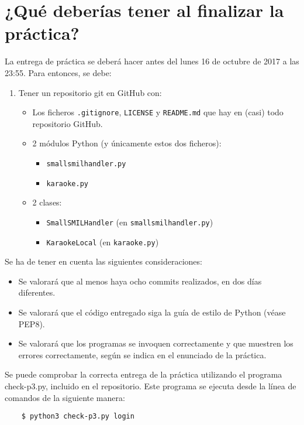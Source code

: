 \documentclass[11pt,a4paper]{article}
\begin{document}
\section{¿Qué deberías tener al finalizar la práctica?}

La entrega de práctica se deberá hacer antes del lunes 16 de octubre de 2017 a las 23:55. Para entonces, se debe: 

\begin{enumerate}
  \item Tener un repositorio git en GitHub con:
  \begin{itemize}
    \item Los ficheros \texttt{.gitignore}, \texttt{LICENSE} y \texttt{README.md} que hay en (casi) todo repositorio GitHub.
    \item 2 módulos Python (y únicamente estos dos ficheros):
    \begin{itemize}
      \item \texttt{smallsmilhandler.py}
      \item \texttt{karaoke.py}
    \end{itemize}
    \item 2 clases:
    \begin{itemize}
      \item \texttt{SmallSMILHandler} (en \texttt{smallsmilhandler.py})
      \item \texttt{KaraokeLocal} (en \texttt{karaoke.py})
    \end{itemize}
  \end{itemize}
\end{enumerate}

Se ha de tener en cuenta las siguientes consideraciones:
\begin{itemize}
  \item Se valorará que al menos haya ocho commits realizados, en dos días diferentes.
  \item Se valorará que el código entregado siga la guía de estilo de Python (véase PEP8).
  \item Se valorará que los programas se invoquen correctamente y que muestren los errores correctamente, según se indica en el enunciado de la práctica.
\end{itemize}

Se puede comprobar la correcta entrega de la práctica utilizando el programa check-p3.py, incluido en el repositorio. Este programa se ejecuta desde la línea de comandos de la siguiente manera:
\begin{verbatim}
	$ python3 check-p3.py login
\end{verbatim}
\end{document}

